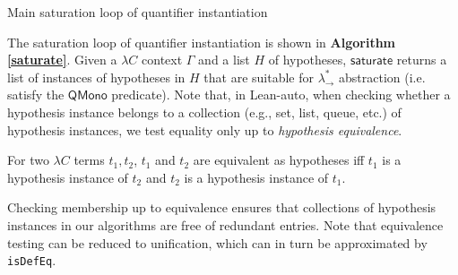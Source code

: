 \begin{algorithm}\label{saturate}
  \DontPrintSemicolon
  \SetNoFillComment
  \caption{Main saturation loop of quantifier instantiation}
\end{algorithm}

The saturation loop of quantifier instantiation is shown in \textbf{Algorithm \ref{saturate}}.
Given a $\lambda C$ context $\Gamma$ and a list $H$ of hypotheses, $\mathsf{saturate}$ returns
a list of instances of hypotheses in $H$ that are suitable for $\lambda_\to^*$ abstraction
(i.e. satisfy the $\mathsf{QMono}$ predicate).
Note that, in Lean-auto, when checking whether a hypothesis instance belongs
to a collection (e.g., set, list, queue, etc.) of hypothesis instances,
we test equality only up to \textit{hypothesis equivalence}.

\begin{definition}
For two $\lambda C$ terms $t_1, t_2$, $t_1$ and $t_2$ are equivalent as hypotheses
iff $t_1$ is a hypothesis instance of $t_2$ and $t_2$ is a hypothesis instance of $t_1$.
\end{definition}

Checking membership up to equivalence ensures that collections of hypothesis
instances in our algorithms are free of redundant entries. Note that equivalence testing
can be reduced to unification, which can in turn be approximated by \texttt{isDefEq}.
 